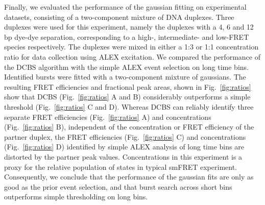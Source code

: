 Finally, we evaluated the performance of the gaussian fitting on experimental datasets, consisting of a two-component mixture of DNA duplexes. Three duplexes were used for this experiment, namely the duplexes with a 4, 6 and 12 bp dye-dye separation, corresponding to a high-, intermediate- and low-FRET species respectively. The duplexes were mixed in either a 1:3 or 1:1 concentration ratio for data collection using ALEX excitation. We compared the performance of the DCBS algorithm with the simple ALEX event selection on long time bins. Identified bursts were fitted with a two-component mixture of gaussians. The resulting FRET efficiencies and fractional peak areas, shown in Fig.~\ref{fig:ratios} show that DCBS (Fig.~\ref{fig:ratios} A and B) considerably outperforms a simple threshold (Fig.~\ref{fig:ratios} C and D). Whereas DCBS can reliably identify three separate FRET efficiencies (Fig.~\ref{fig:ratios} A) and concentrations (Fig.~\ref{fig:ratios} B), independent of the concentration or FRET efficiency of the partner duplex, the FRET efficiencies (Fig.~\ref{fig:ratios} C) and concentrations (Fig.~\ref{fig:ratios} D) identified by simple ALEX analysis of long time bins are distorted by the partner peak values. Concentrations in this experiment is a proxy for the relative population of states in typical smFRET experiment. Consequently, we conclude that the performance of the gaussian fits are only as good as the prior event selection, and that burst search across short bins outperforms simple thresholding on long bins.

